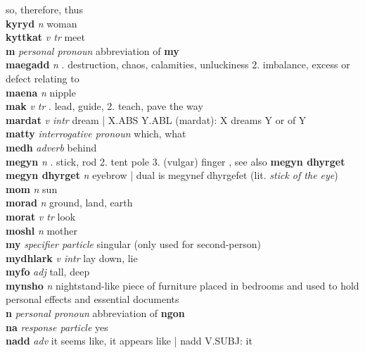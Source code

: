 so, therefore, thus\\\textbf{kyryd}   \emph{n} \textperiodcentered woman\\\textbf{kyttkat}   \emph{v tr} \textperiodcentered meet\\\textbf{m}   \emph{personal pronoun} \textperiodcentered abbreviation of \textbf{my}\\\textbf{maegadd}   \emph{n} . destruction, chaos, calamities, unluckiness 2. imbalance, excess or defect relating to \GEN \\\textbf{maena}   \emph{n} \textperiodcentered nipple\\\textbf{mak}   \emph{v tr} . lead, guide, 2. teach, pave the way \\\textbf{mardat}   \emph{v intr} \textperiodcentered dream | X.ABS Y.ABL (mardat): X dreams Y or of Y\\\textbf{matty}   \emph{interrogative pronoun} \textperiodcentered which, what\\\textbf{medh}   \emph{adverb} \textperiodcentered behind\\\textbf{megyn}   \emph{n} . stick, rod 2. tent pole 3. (vulgar) finger , see also \textbf{megyn dhyrget}\\\textbf{megyn dhyrget}   \emph{n} \textperiodcentered eyebrow | dual is megynef dhyrgefet (lit. \emph{stick of the eye})\\\textbf{mom}   \emph{n} \textperiodcentered sun\\\textbf{morad}   \emph{n} \textperiodcentered ground, land, earth\\\textbf{morat}   \emph{v tr} \textperiodcentered look\\\textbf{moshl}   \emph{n} \textperiodcentered mother\\\textbf{my}   \emph{specifier particle} \textperiodcentered singular (only used for second-person)\\\textbf{mydhlark}   \emph{v intr} \textperiodcentered lay down, lie\\\textbf{myfo}   \emph{adj} \textperiodcentered tall, deep\\\textbf{mynsho}   \emph{n} \textperiodcentered nightstand-like piece of furniture placed in bedrooms and used to hold personal effects and essential documents\\\textbf{n}   \emph{personal pronoun} \textperiodcentered abbreviation of \textbf{ngon}\\\textbf{na}   \emph{response particle} \textperiodcentered yes\\\textbf{nadd}   \emph{adv} \textperiodcentered it seems like, it appears like | nadd V.SUBJ: it 